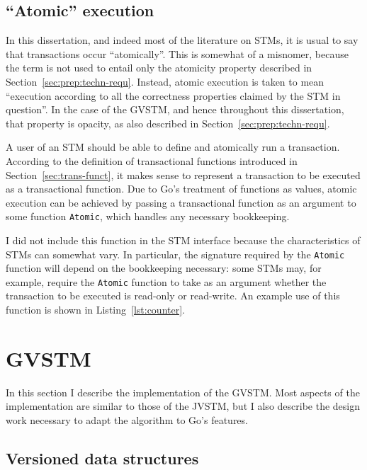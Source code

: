 \documentclass[12pt,a4paper,oneside,openright]{report}
\newcommand{\goFunc}[1]{\texttt{#1}}
\begin{document}
\subsection{``Atomic'' execution}
\label{sec:atomic-function}

In this dissertation, and indeed most of the literature on STMs, it is
usual to say that transactions occur ``atomically''. This is somewhat
of a misnomer, because the term is not used to entail only the
atomicity property described in
Section~\ref{sec:prep:techn-requ}. Instead, atomic execution is taken
to mean ``execution according to all the correctness properties
claimed by the STM in question''. In the case of the GVSTM, and hence
throughout this dissertation, that property is opacity, as also
described in Section~\ref{sec:prep:techn-requ}.

A user of an STM should be able to define and atomically run a
transaction. According to the definition of transactional functions
introduced in Section~\ref{sec:trans-funct}, it makes sense to
represent a transaction to be executed as a transactional
function. Due to Go's treatment of functions as values, atomic
execution can be achieved by passing a transactional function as an
argument to some function \goFunc{Atomic}, which handles any necessary
bookkeeping.

I did not include this function in the STM interface because the
characteristics of STMs can somewhat vary. In particular, the
signature required by the \goFunc{Atomic} function will depend on the
bookkeeping necessary: some STMs may, for example, require the
\goFunc{Atomic} function to take as an argument whether the
transaction to be executed is read-only or read-write. An example use
of this function is shown in Listing~\ref{lst:counter}.

\section{GVSTM}
\label{sec:impl:gvstm}

In this section I describe the implementation of the GVSTM. Most
aspects of the implementation are similar to those of the JVSTM, but I
also describe the design work necessary to adapt the algorithm to Go's
features.

\subsection{Versioned data structures}
\label{sec:impl:vers-data-struct}
\end{document}

